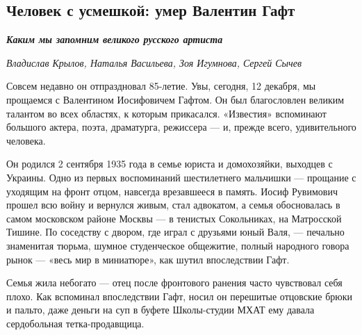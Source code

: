  
 
 
 
 
 
\subsection{Человек с усмешкой: умер Валентин Гафт}
\label{sec:12_11_2020.news.ru.izvestia.1.chelovek_s_usmeshkoj_gaft}

\begingroup
\em\centering\bfseries\large\color{blue}
Каким мы запомним великого русского артиста
\endgroup


{\em Владислав Крылов, Наталья Васильева, Зоя Игумнова, Сергей Сычев}

Совсем недавно он отпраздновал 85-летие. Увы, сегодня, 12 декабря, мы прощаемся
с Валентином Иосифовичем Гафтом. Он был благословлен великим талантом во всех
областях, к которым прикасался. «Известия» вспоминают большого актера, поэта,
драматурга, режиссера — и, прежде всего, удивительного человека.

Он родился 2 сентября 1935 года в семье юриста и домохозяйки, выходцев с
Украины. Одно из первых воспоминаний шестилетнего мальчишки — прощание с
уходящим на фронт отцом, навсегда врезавшееся в память. Иосиф Рувимович прошел
всю войну и вернулся живым, стал адвокатом, а семья обосновалась в самом
московском районе Москвы — в тенистых Сокольниках, на Матросской Тишине. По
соседству с двором, где играл с друзьями юный Валя, — печально знаменитая
тюрьма, шумное студенческое общежитие, полный народного говора рынок — «весь
мир в миниатюре», как шутил впоследствии Гафт.

Семья жила небогато — отец после фронтового ранения часто чувствовал себя
плохо. Как вспоминал впоследствии Гафт, носил он перешитые отцовские брюки и
пальто, даже деньги на суп в буфете Школы-студии МХАТ ему давала сердобольная
тетка-продавщица.

